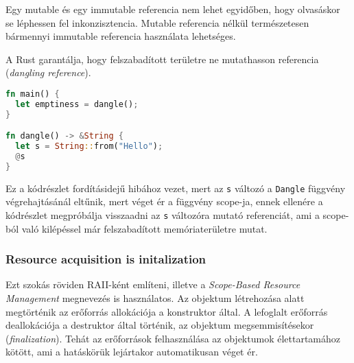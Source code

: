 Egy mutable és egy immutable referencia nem lehet egyidőben, hogy olvasáskor se léphessen fel inkonzisztencia. Mutable referencia nélkül természetesen bármennyi immutable referencia használata lehetséges.

A Rust garantálja, hogy felszabadított területre ne mutathasson referencia (\textit{dangling reference}).
\begin{lstlisting}[language=Rust, style=boxed]
fn main() {
  let emptiness = dangle();
}

fn dangle() -> &String {
  let s = String::from("Hello");
  @s
}
\end{lstlisting}
Ez a kódrészlet fordításidejű hibához vezet, mert az \lstinline{s} változó a \lstinline{Dangle} függvény végrehajtásánál eltűnik, mert véget ér a függvény scope-ja, ennek ellenére a kódrészlet megpróbálja visszaadni az \lstinline{s} változóra mutató referenciát, ami a scope-ból való kilépéssel már felszabadított memóriaterületre mutat.

\subsubsection{Resource acquisition is initalization }

Ezt szokás röviden RAII-ként említeni, illetve a \textit{Scope-Based Resource Management} megnevezés is használatos.
Az objektum létrehozása alatt megtörténik az erőforrás allokációja a konstruktor által. A lefoglalt erőforrás deallokációja a destruktor által történik, az objektum megsemmisítésekor (\textit{finalization}).  Tehát az erőforrások felhasználása az objektumok élettartamához kötött, ami a hatáskörük lejártakor automatikusan véget ér.

